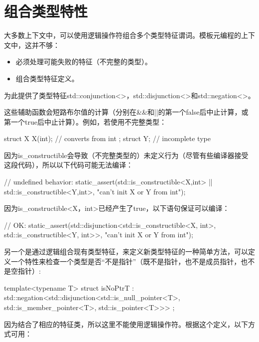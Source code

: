 \section{组合类型特性}

大多数上下文中，可以使用逻辑操作符组合多个类型特征谓词。模板元编程的上下文中，这并不够：

\begin{itemize}
\item 
必须处理可能失败的特征（不完整的类型）。

\item 
组合类型特征定义。
\end{itemize}

为此提供了类型特征std::conjunction<>，std::disjunction<>和std::negation<>。

这些辅助函数会短路布尔值的计算（分别在\&\&和||的第一个false后中止计算，或第一个true后中止计算）。例如，若使用不完整类型：

\begin{cpp}
struct X {
	X(int); // converts from int
};
struct Y; // incomplete type
\end{cpp}

因为is\_constructible会导致（不完整类型的）未定义行为（尽管有些编译器接受这段代码），所以以下代码可能无法编译：

\begin{cpp}
// undefined behavior:
static_assert(std::is_constructible<X,int>{}
				|| std::is_constructible<Y,int>{},
			"can't init X or Y from int");
\end{cpp}

因为is\_constructible<X，int>已经产生了true，以下语句保证可以编译：

\begin{cpp}
// OK:
static_assert(std::disjunction<std::is_constructible<X, int>,
								std::is_constructible<Y, int>>{},
			"can't init X or Y from int");
\end{cpp}

另一个是通过逻辑组合现有类型特征，来定义新类型特征的一种简单方法，可以定义一个特性来检查一个类型是否“不是指针”（既不是指针，也不是成员指针，也不是空指针）:

\begin{cpp}
template<typename T>
struct isNoPtrT : std::negation<std::disjunction<std::is_null_pointer<T>,
												std::is_member_pointer<T>,
												std::is_pointer<T>>> {};
\end{cpp}

因为结合了相应的特征类，所以这里不能使用逻辑操作符。根据这个定义，以下方式可用：

